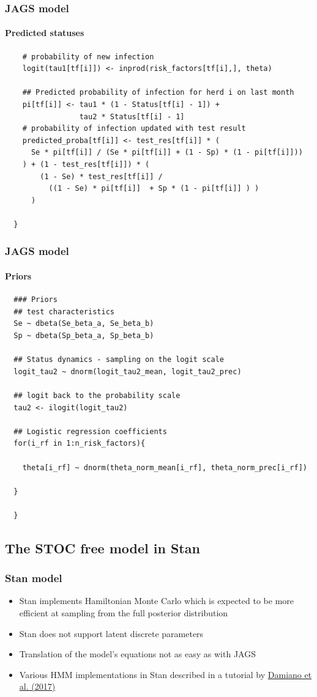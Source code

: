 \documentclass{beamer}
\begin{document}
\begin{frame}[fragile]
\frametitle{JAGS model}
\framesubtitle{Predicted statuses}
\scriptsize
\begin{verbatim}
    # probability of new infection
    logit(tau1[tf[i]]) <- inprod(risk_factors[tf[i],], theta)
    
    ## Predicted probability of infection for herd i on last month
    pi[tf[i]] <- tau1 * (1 - Status[tf[i] - 1]) + 
                 tau2 * Status[tf[i] - 1]
    # probability of infection updated with test result
    predicted_proba[tf[i]] <- test_res[tf[i]] * (  
      Se * pi[tf[i]] / (Se * pi[tf[i]] + (1 - Sp) * (1 - pi[tf[i]]))
    ) + (1 - test_res[tf[i]]) * (                  
        (1 - Se) * test_res[tf[i]] /
          ((1 - Se) * pi[tf[i]]  + Sp * (1 - pi[tf[i]] ) )
      )
    
  }
\end{verbatim}
\end{frame}

\begin{frame}[fragile]
\frametitle{JAGS model}
\framesubtitle{Priors}
\scriptsize
\begin{verbatim}
  ### Priors
  ## test characteristics
  Se ~ dbeta(Se_beta_a, Se_beta_b)
  Sp ~ dbeta(Sp_beta_a, Sp_beta_b)

  ## Status dynamics - sampling on the logit scale
  logit_tau2 ~ dnorm(logit_tau2_mean, logit_tau2_prec)

  ## logit back to the probability scale
  tau2 <- ilogit(logit_tau2)
  
  ## Logistic regression coefficients
  for(i_rf in 1:n_risk_factors){
    
    theta[i_rf] ~ dnorm(theta_norm_mean[i_rf], theta_norm_prec[i_rf])
    
  }
  
  }
\end{verbatim}
\end{frame}


\subsection[Stan]{The STOC free model in Stan}

\begin{frame}[fragile]
\frametitle{Stan model}
\begin{itemize}
 \item{Stan implements Hamiltonian Monte Carlo which is expected to be more efficient at sampling from the full posterior distribution}
 \item{Stan does not support latent discrete parameters}
 \item{Translation of the model’s equations not as easy as with JAGS}
 \item{Various HMM implementations in Stan described in a tutorial by \href{https://github.com/luisdamiano/stancon18}{Damiano et al. (2017)}}
\end{itemize}
\end{frame}
\end{document}
